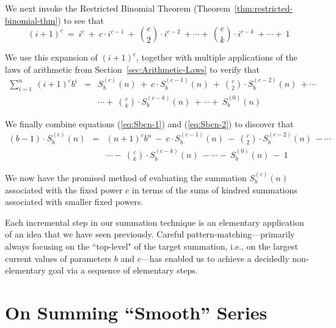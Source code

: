 \smallskip

We next invoke the Restricted Binomial Theorem (Theorem~\ref{thm:restricted-binomial-thm}) to see that
\[ (i+1)^c \ = \ i^c \ + \ c \cdot i^{c-1} \ + \ {c \choose 2} \cdot
i^{c-2} \ + \cdots + \ {c \choose k} \cdot i^{c-k}  \ + \cdots + \ 1
\]

We use this expansion of $(i+1)^c$, together with multiple applications of the laws of arithmetic from Section~\ref{sec:Arithmetic-Laws} to verify that
\begin{eqnarray}
\nonumber
\sum_{i=1}^n \ (i+1)^c b^{i} & = &
S_b^{(c)}(n)
 \ + \ c \cdot S_b^{(c-1)}(n)
 \ + \ {c \choose 2} \cdot S_b^{(c-2)}(n)  \ + \cdots \\
\label{eq:Sbcn-2}
  &  & \cdots + \
{c \choose k} \cdot S_b^{(c-k)}(n)
 \ + \cdots + \
S_b^{(0)}(n)
\end{eqnarray}

\smallskip

%
We finally combine equations (\ref{eq:Sbcn-1}) and (\ref{eq:Sbcn-2}) to discover that
\begin{eqnarray}
\nonumber
(b-1) \cdot S_b^{(c)}(n)
 & = &
(n+1)^{c} b^{n} \ - \
c \cdot S_b^{(c-1)}(n)
 \ - \ {c \choose 2} \cdot S_b^{(c-2)}(n)  \ - \cdots \\
\label{eq:Sbcn-3}
  &  & 
\cdots - \
{c \choose k} \cdot S_b^{(c-k)}(n)
 \ - \cdots - \
S_b^{(0)}(n)
\ - \ 1
\end{eqnarray}

We now have the promised method of evaluating the summation $S_b^{(c)}(n)$ associated with the fixed power $c$ in terms of the sums of kindred summations associated with smaller fixed powers.

\bigskip

Each incremental step in our summation technique is an elementary application of an idea that we have seen previously.  Careful pattern-matching---primarily always focusing on the ``top-level" of the target summation, i.e., on the largest current values of parameters $b$ and $c$---has enabled us to achieve a decidedly non-elementary goal via a sequence of elementary steps.


\section{On Summing ``Smooth'' Series}
\label{sec:smooth-series}

